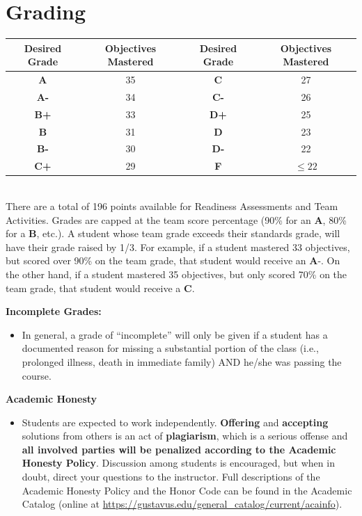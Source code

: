 \documentclass[11pt]{article}
\begin{document}
\section*{Grading}
\begin{center}
\begin{tabular}{|c|c|c|c|}
\hline
Desired Grade&Objectives Mastered&Desired Grade&Objectives Mastered\\
\hline
\textbf{A}&35&\textbf{C}&27\\
\hline
\textbf{A-}&34&\textbf{C-}&26\\
\hline
\textbf{B+}&33&\textbf{D+}&25\\
\hline
\textbf{B}&31&\textbf{D}&23\\
\hline
\textbf{B-}&30&\textbf{D-}&22\\
\hline
\textbf{C+}&29&\textbf{F}&$\leq 22$\\
\hline
\end{tabular}\\
There are a total of 196 points available for Readiness Assessments and Team Activities. Grades are capped at the team score percentage (90\% for an \textbf{A}, 80\% for a \textbf{B}, etc.). A student whose team grade exceeds their standards grade, will have their grade raised by 1/3. For example, if a student mastered 33 objectives, but scored over 90\% on the team grade, that student would receive an $\textbf{A-}$. On the other hand, if a student mastered 35 objectives, but only scored 70\% on the team grade, that student would receive a \textbf{C}.
\noindent

\end{center}
\newpage 

\textbf {\large Incomplete Grades:}
		\begin{itemize}
			\item  In general, a grade of “incomplete” will only be given if a student has a documented reason for missing a substantial portion of the class (i.e., prolonged illness, death in 			immediate family) AND he/she was passing the course. \\
		\end{itemize}
\textbf {\large Academic Honesty}
		\begin{itemize}
			\item Students are expected to work independently. \textbf{Offering} and \textbf{accepting} solutions from others is an act of \textbf{plagiarism}, which is a serious offense and 			\textbf{all involved parties will be penalized according to the Academic Honesty Policy}. Discussion among students is encouraged, but when in doubt, direct your questions 					to the instructor. Full descriptions of the Academic Honesty Policy and the Honor Code can be found in the Academic Catalog (online at 		 																\url{https://gustavus.edu/general_catalog/current/acainfo}). 
		\end{itemize}	
\end{document}
